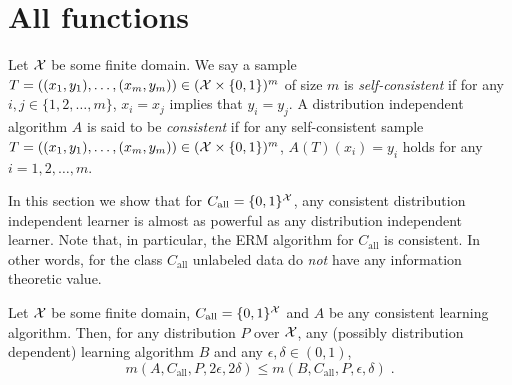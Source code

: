 \section{All functions}
\label{section:all-functions}

Let $\mathcal{X}$ be some finite domain. We say a sample $T = ((x_1,y_1),
\dots,(x_m,y_m)) \in (\mathcal{X} \times \{0,1\})^m$ of size $m$ is
\emph{self-consistent} if for any $i,j \in \{1,2,\dots,m\}$, $x_i = x_j$
implies that $y_i = y_j$. A distribution independent algorithm $A$ is said to be
\emph{consistent} if for any self-consistent sample $T = ((x_1,y_1),
\dots,(x_m,y_m)) \in (\mathcal{X} \times \{0,1\})^m$, $A(T)(x_i) = y_i$ holds for any
$i=1,2,\dots,m$.

In this section we show that for $C_{\text{all}} = \{0,1\}^{\mathcal{X}}$, any consistent
distribution independent learner is almost as powerful as any distribution
independent learner. Note that, in particular, the ERM algorithm for
$C_{\text{all}}$ is consistent. In other words, for the class $C_{\text{all}}$
unlabeled data do \emph{not} have any information theoretic value.

\begin{theorem}[No Gap]
Let $\mathcal{X}$ be some finite domain, $C_{\text{all}} = \{0,1\}^{\mathcal{X}}$ and $A$ be any
consistent learning algorithm. Then, for any distribution $P$ over $\mathcal{X}$, any
(possibly distribution dependent) learning algorithm $B$ and any $\epsilon, \delta \in (0,1)$,
$$
m(A,C_{\text{all}},P,2\epsilon,2\delta) \le m(B,C_{\text{all}},P,\epsilon,\delta) \; .
$$
\end{theorem}

